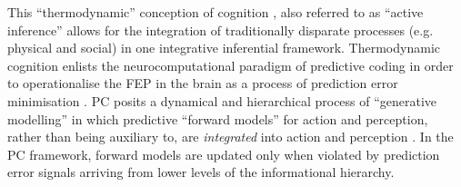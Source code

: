 \begin{CJK}{UTF8}{gbsn}
This ``thermodynamic'' conception of cognition \citep[see][]{Yufik2013}, also referred to as ``active inference'' \citep[see][]{Friston2010} allows for the integration of traditionally disparate processes (e.g. physical and social) in one integrative inferential framework.  Thermodynamic cognition enlists the neurocomputational paradigm of predictive coding \citep[hereafter PC, see][]{Rao1999} in order to operationalise the FEP in the brain as a process of prediction error minimisation \citep{Clark2013}.  PC posits a dynamical and hierarchical process of ``generative modelling'' in which predictive ``forward models'' for action and perception, rather than being auxiliary to, are \textit{integrated} into action and perception \citep[as the instructions for action and perception themselves; for a more detailed review of Auxiliary Forward Models and Integrative Forward Models, see Appendix~\ref{app2:motorControl};]{Pickering2014}. In the PC framework, forward models are updated only when violated by prediction error signals arriving from lower levels of the informational hierarchy.




\end{CJK}
